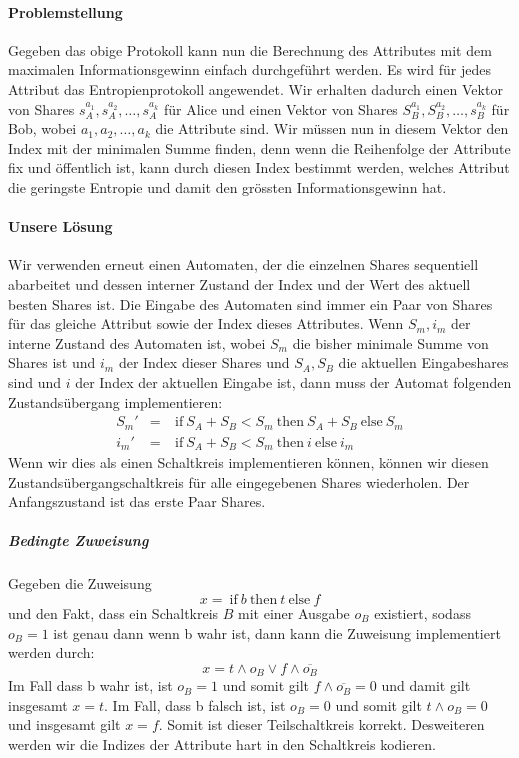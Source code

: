 \documentclass{article}
\begin{document}
\paragraph{Problemstellung}
Gegeben das obige Protokoll kann nun die Berechnung des Attributes
mit dem maximalen Informationsgewinn einfach durchgef\"uhrt werden.
Es wird f\"ur jedes Attribut das Entropienprotokoll angewendet. Wir
erhalten dadurch einen Vektor von Shares 
\(s_A^{a_1}, s_A^{a_2}, \dots, s_A^{a_k}\) f\"ur Alice und einen 
Vektor von Shares \(S_B^{a_1}, S_B^{a_2}, \dots, s_B^{a_k}\) f\"ur
Bob, wobei \(a_1, a_2, \dots, a_k\) die Attribute sind. Wir m\"ussen
nun in diesem Vektor den Index mit der minimalen Summe finden, denn wenn
die Reihenfolge der Attribute fix und \"offentlich ist, kann durch
diesen Index bestimmt werden, welches Attribut die geringste Entropie
und damit den gr\"ossten Informationsgewinn hat.\\
\paragraph{Unsere L\"osung}
Wir verwenden erneut einen Automaten, der die einzelnen Shares 
sequentiell abarbeitet und dessen interner Zustand der Index und der
Wert des aktuell besten Shares ist. Die Eingabe des Automaten sind
immer ein Paar von Shares f\"ur das gleiche Attribut sowie der
Index dieses Attributes. Wenn \(S_m, i_m\) der interne Zustand
des Automaten ist, wobei \(S_m\) die bisher minimale Summe von
Shares ist und \(i_m\) der Index dieser Shares und \(S_A, S_B\)
die aktuellen Eingabeshares sind und \(i\) der Index der aktuellen
Eingabe ist, dann muss der Automat folgenden Zustands\"ubergang
implementieren:
\begin{align*}
S_m' &=& \:\mathrm{if} \: S_A + S_B < S_m \: \mathrm{then} \: S_A + S_B \: \mathrm{else} \: S_m \\
i_m' &=& \: \mathrm{if} \: S_A + S_B < S_m \: \mathrm{then} \: i \: \mathrm{ else } \: i_m
\end{align*}
Wenn wir dies als einen Schaltkreis implementieren k\"onnen, 
k\"onnen wir diesen Zustands\"ubergangschaltkreis f\"ur alle
eingegebenen Shares wiederholen. Der Anfangszustand ist
das erste Paar Shares.

\subparagraph{Bedingte Zuweisung}
Gegeben die Zuweisung 
\begin{equation}
x = \: \mathrm{if} \: b \: \mathrm{then} \: t \: \mathrm{else} \: f
\end{equation}
und den Fakt, dass ein Schaltkreis \(B\) mit einer Ausgabe
\(o_B\) existiert, sodass \(o_B = 1\) ist genau dann wenn
b wahr ist, dann kann  die Zuweisung implementiert werden
durch:
\begin{equation}
x = t \wedge o_B \vee f \wedge \overline{o_B}
\end{equation}
Im Fall dass b wahr ist, ist \(o_B = 1\) und somit
gilt \(f \wedge \overline{o_B} = 0\) und damit gilt
insgesamt \(x = t\). Im Fall, dass b falsch ist, ist
\(o_B = 0\) und somit gilt \(t \wedge o_B = 0\) und
insgesamt gilt \(x = f\). Somit ist dieser Teilschaltkreis
korrekt. Desweiteren werden wir die Indizes der Attribute
hart in den Schaltkreis kodieren. 
\end{document}

